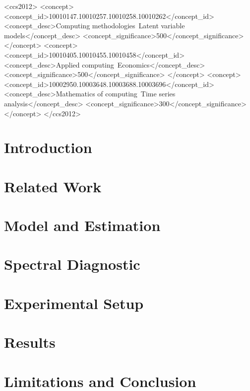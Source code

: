 \documentclass[sigconf,anonymous,pbalance]{acmart}
\begin{document}
\begin{CCSXML}
<ccs2012>
<concept>
<concept_id>10010147.10010257.10010258.10010262</concept_id>
<concept_desc>Computing methodologies~Latent variable models</concept_desc>
<concept_significance>500</concept_significance>
</concept>
<concept>
<concept_id>10010405.10010455.10010458</concept_id>
<concept_desc>Applied computing~Economics</concept_desc>
<concept_significance>500</concept_significance>
</concept>
<concept>
<concept_id>10002950.10003648.10003688.10003696</concept_id>
<concept_desc>Mathematics of computing~Time series analysis</concept_desc>
<concept_significance>300</concept_significance>
</concept>
</ccs2012>
\end{CCSXML}



\maketitle

\section{Introduction}
\label{sec:introduction}


\section{Related Work}
\label{sec:related}


\section{Model and Estimation}
\label{sec:model}


\section{Spectral Diagnostic}
\label{sec:spectral}


\section{Experimental Setup}
\label{sec:setup}


\section{Results}
\label{sec:results}


\section{Limitations and Conclusion}
\label{sec:conclusion}




\end{document}
